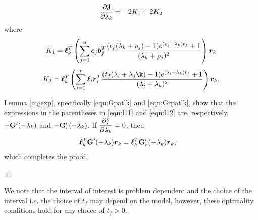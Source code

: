 \documentclass[twocolumn]{autart}
\begin{document}
\begin{dmath}
\pder[\J]{\lambda_k} =-2K_1+2K_2
\end{dmath}
where
\begin{dmath}\label{eqn:l11} 
K_1=\lc_k^T \left(\sum_{j=1}^n \cc_j\bb_j^T \dfrac{({\tf}(\lambda_k+\rho_j)-1)e^{(\rho_j+\lambda_k){\tf}}+1}{(\lambda_k+\rho_j)^2}\right)\rc_k  
\end{dmath}
\begin{dmath}\label{eqn:l12} 
K_2=\lc_k^T \left(\sum^r_{i=1} \lc_i\rc_i^T\dfrac{({\tf}(\lambda_i+\lambda_j\k)-1)e^{(\lambda_i+\lambda_k){\tf}}+1}{(\lambda_i+\lambda_k)^2}\right)\rc_k.
\end{dmath}


Lemma \eqref{mgexp}, specifically \eqref{eqn:Gpatlk} and \eqref{eqn:Grpatlk}, show that the expressions in the parentheses in \eqref{eqn:l11}  and \eqref{eqn:l12}   are, respectively, $-\G'(-\lambda_k)$ and $-\G_r'(-\lambda_k)$.
If $\pder[\J]{\lambda_k}= 0$, then
\begin{align*}
\lc_k^T\G'(-\lambda_k)\rc_k&=\lc_k^T\G_r'(-\lambda_k)\rc_k,
\end{align*}
which completes the proof.
\begin{flushright} $\Box$  \end{flushright}
{\color{red} We note that the interval of interest is problem dependent and the choice of the interval i.e. the choice of $t_f$ may depend on the model, however, these optimality conditions hold for any choice of $t_f>0$.}
\end{document}

